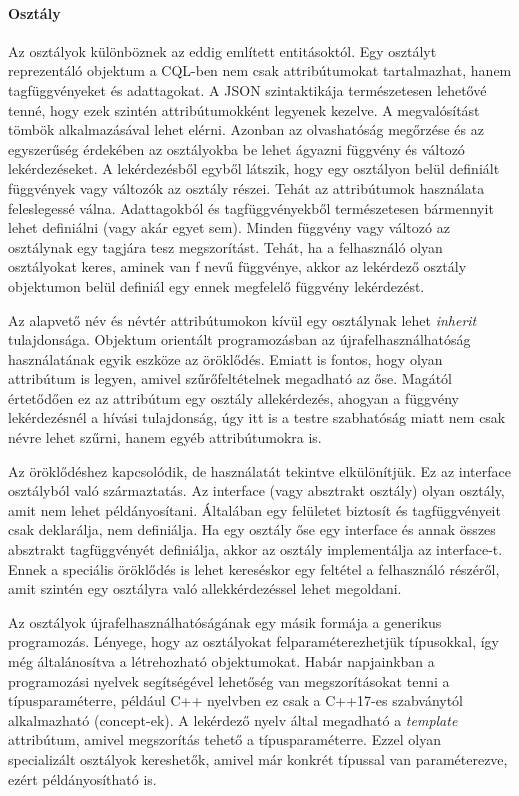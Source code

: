 \documentclass[a4paper,12pt]{report}
\begin{document}
\paragraph{Osztály}
Az osztályok különböznek az eddig említett entitásoktól. Egy osztályt reprezentáló objektum a CQL-ben nem csak attribútumokat tartalmazhat, hanem tagfüggvényeket és adattagokat. A JSON szintaktikája természetesen lehetővé tenné, hogy ezek szintén attribútumokként legyenek kezelve. A megvalósítást tömbök alkalmazásával lehet elérni. Azonban az olvashatóság megőrzése és az egyszerűség érdekében az osztályokba be lehet ágyazni függvény és változó lekérdezéseket. A lekérdezésből egyből látszik, hogy egy osztályon belül definiált függvények vagy változók az osztály részei. Tehát az attribútumok használata feleslegessé válna. Adattagokból és tagfüggvényekből természetesen bármennyit lehet definiálni (vagy akár egyet sem). Minden függvény vagy változó az osztálynak egy tagjára tesz megszorítást. Tehát, ha a felhasználó olyan osztályokat keres, aminek van f nevű függvénye, akkor az lekérdező osztály objektumon belül definiál egy ennek megfelelő függvény lekérdezést.
\par Az alapvető név és névtér attribútumokon kívül egy osztálynak lehet \textit{inherit} tulajdonsága. Objektum orientált programozásban az újrafelhasználhatóság használatának egyik eszköze az öröklődés. Emiatt is fontos, hogy olyan attribútum is legyen, amivel szűrőfeltételnek megadható az őse. Magától értetődően ez az attribútum egy osztály allekérdezés, ahogyan a függvény lekérdezésnél a hívási tulajdonság, úgy itt is a testre szabhatóság miatt nem csak névre lehet szűrni, hanem egyéb attribútumokra is.
\par Az öröklődéshez kapcsolódik, de használatát tekintve elkülönítjük. Ez az interface osztályból való származtatás. Az interface (vagy absztrakt osztály) olyan osztály, amit nem lehet példányosítani. Általában egy felületet biztosít és tagfüggvényeit csak deklarálja, nem definiálja. Ha egy osztály őse egy interface és annak összes absztrakt tagfüggvényét definiálja, akkor az osztály implementálja az interface-t. Ennek a speciális öröklődés is lehet kereséskor egy feltétel a felhasználó részéről, amit szintén egy osztályra való allekkérdezéssel lehet megoldani.
\par Az osztályok újrafelhasználhatóságának egy másik formája a generikus programozás. Lényege, hogy az osztályokat felparaméterezhetjük típusokkal, így még általánosítva a létrehozható objektumokat. Habár napjainkban a programozási nyelvek segítségével lehetőség van megszorításokat tenni a típusparaméterre, például C++ nyelvben ez csak a C++17-es szabványtól alkalmazható (concept-ek). A lekérdező nyelv által megadható a \textit{template} attribútum, amivel megszorítás tehető a típusparaméterre. Ezzel olyan specializált osztályok kereshetők, amivel már konkrét típussal van paraméterezve, ezért példányosítható is.
\end{document}

